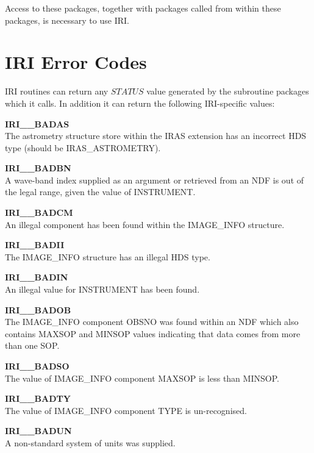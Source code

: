 Access to these packages, together with packages called from within these
packages, is necessary to use IRI.

\section{IRI Error Codes}
\label {APP:ERRORS}
IRI routines can return any $STATUS$ value generated by the subroutine packages
which it calls. In addition it can return the following IRI-specific values:

\begin{description}

\item {\bf IRI\_\_BADAS}\\
The astrometry structure store within the IRAS extension has an incorrect
HDS type (should be IRAS\_ASTROMETRY).

\item {\bf IRI\_\_BADBN}\\
A wave-band index supplied as an argument or retrieved from an NDF is out of
the legal range, given the value of INSTRUMENT.

\item {\bf IRI\_\_BADCM}\\
An illegal component has been found within the IMAGE\_INFO structure.

\item {\bf IRI\_\_BADII}\\
The IMAGE\_INFO structure has an illegal HDS type.

\item {\bf IRI\_\_BADIN}\\
An illegal value for INSTRUMENT has been found.

\item {\bf IRI\_\_BADOB}\\
The IMAGE\_INFO component OBSNO was found within an NDF which also contains
MAXSOP and MINSOP values indicating that data comes from more than one SOP.

\item {\bf IRI\_\_BADSO}\\
The value of IMAGE\_INFO component MAXSOP is less than MINSOP.

\item {\bf IRI\_\_BADTY}\\
The value of IMAGE\_INFO component TYPE is un-recognised.

\item {\bf IRI\_\_BADUN}\\
A non-standard system of units was supplied.


\end{description}
